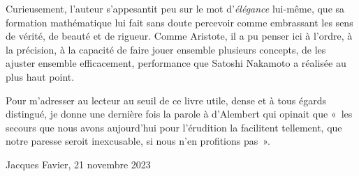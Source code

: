 Curieusement, l'auteur s'appesantit peu sur le mot d'\emph{élégance} lui-même, que sa formation mathématique lui fait sans doute percevoir comme embrassant les sens de vérité, de beauté et de rigueur. Comme Aristote, il a pu penser ici à l'ordre, à la précision, à la capacité de faire jouer ensemble plusieurs concepts, de les ajuster ensemble efficacement, performance que Satoshi Nakamoto a réalisée au plus haut point.

Pour m'adresser au lecteur au seuil de ce livre utile, dense et à tous égards distingué, je donne une dernière fois la parole à d'Alembert qui opinait que «~les secours que nous avons aujourd'hui pour l'érudition la facilitent tellement, que notre paresse seroit inexcusable, si nous n'en profitions pas~».

\begin{flushright}Jacques Favier, 21 novembre 2023\end{flushright}

